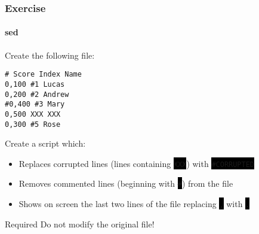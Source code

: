 \documentclass[unknownkeysallowed, 10pt, a4 paper, handout]{beamer}
\newcommand{\code}[1]{\colorbox{black}{\color{green}\texttt{#1}}}
\begin{document}
\begin{frame}[fragile=singleslide]
  \frametitle{Exercise}
  \framesubtitle{sed}

  \begin{block}{Create the following file:}
    \begin{verbatim}
# Score Index Name
0,100 #1 Lucas
0,200 #2 Andrew
#0,400 #3 Mary
0,500 XXX XXX
0,300 #5 Rose
    \end{verbatim}
  \end{block}

  \begin{exampleblock}{Create a script which:}
    \begin{itemize}
      \item Replaces corrupted lines (lines containing \code{XXX}) with
        \code{\#CORRUPTED}
      \item Removes commented lines (beginning with \code{\#}) from the file
      \item Shows on screen the last two lines of the file replacing \code{,}
        with \code{.}
    \end{itemize}
  \end{exampleblock}

  \begin{alertblock}{Required}
    Do not modify the original file!
  \end{alertblock}
\end{frame}
\end{document}
